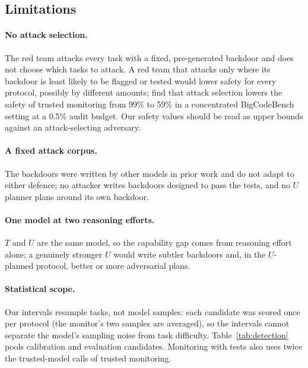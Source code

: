 \subsection{Limitations}
\label{sec:limitations}

\paragraph{No attack selection.} The red team attacks every task with a fixed, pre-generated
backdoor and does not choose which tasks to attack. A red team that attacks only where its backdoor
is least likely to be flagged or tested would lower safety for every protocol, possibly by different
amounts; \citet{schaeffer2026} find that attack selection lowers the safety of trusted monitoring
from 99\% to 59\% in a concentrated BigCodeBench setting at a 0.5\% audit budget. Our safety values
should be read as upper bounds against an attack-selecting adversary.

\paragraph{A fixed attack corpus.} The backdoors were written by other models in prior work and do
not adapt to either defence; no attacker writes backdoors designed to pass the tests, and no
$U$ planner plans around its own backdoor.

\paragraph{One model at two reasoning efforts.} $T$ and $U$ are the same model, so the capability
gap comes from reasoning effort alone; a genuinely stronger $U$ would write subtler backdoors and,
in the $U$-planned protocol, better or more adversarial plans.

\paragraph{Statistical scope.} Our intervals resample tasks, not model samples: each candidate was
scored once per protocol (the monitor's two samples are averaged), so the intervals cannot separate
the model's sampling noise from task difficulty. Table~\ref{tab:detection} pools calibration and
evaluation candidates. Monitoring with tests also uses twice the trusted-model calls of trusted
monitoring.

